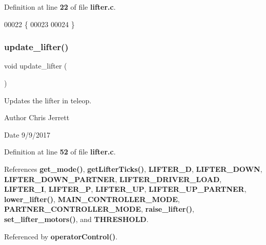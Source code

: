 Definition at line \textbf{ 22} of file \textbf{ lifter.\+c}.


\begin{DoxyCode}
00022                              \{
00023 
00024 \}
\end{DoxyCode}
\mbox{\label{lifter_8h_a59bb7413777ca16aba124aaedf95c79b}} 
\subsubsection{update\+\_\+lifter()}
{\footnotesize\ttfamily void update\+\_\+lifter (\begin{DoxyParamCaption}{ }\end{DoxyParamCaption})}



Updates the lifter in teleop. 

\begin{DoxyAuthor}{Author}
Chris Jerrett 
\end{DoxyAuthor}
\begin{DoxyDate}{Date}
9/9/2017 
\end{DoxyDate}


Definition at line \textbf{ 52} of file \textbf{ lifter.\+c}.



References \textbf{ get\+\_\+mode()}, \textbf{ get\+Lifter\+Ticks()}, \textbf{ L\+I\+F\+T\+E\+R\+\_\+D}, \textbf{ L\+I\+F\+T\+E\+R\+\_\+\+D\+O\+WN}, \textbf{ L\+I\+F\+T\+E\+R\+\_\+\+D\+O\+W\+N\+\_\+\+P\+A\+R\+T\+N\+ER}, \textbf{ L\+I\+F\+T\+E\+R\+\_\+\+D\+R\+I\+V\+E\+R\+\_\+\+L\+O\+AD}, \textbf{ L\+I\+F\+T\+E\+R\+\_\+I}, \textbf{ L\+I\+F\+T\+E\+R\+\_\+P}, \textbf{ L\+I\+F\+T\+E\+R\+\_\+\+UP}, \textbf{ L\+I\+F\+T\+E\+R\+\_\+\+U\+P\+\_\+\+P\+A\+R\+T\+N\+ER}, \textbf{ lower\+\_\+lifter()}, \textbf{ M\+A\+I\+N\+\_\+\+C\+O\+N\+T\+R\+O\+L\+L\+E\+R\+\_\+\+M\+O\+DE}, \textbf{ P\+A\+R\+T\+N\+E\+R\+\_\+\+C\+O\+N\+T\+R\+O\+L\+L\+E\+R\+\_\+\+M\+O\+DE}, \textbf{ raise\+\_\+lifter()}, \textbf{ set\+\_\+lifter\+\_\+motors()}, and \textbf{ T\+H\+R\+E\+S\+H\+O\+LD}.



Referenced by \textbf{ operator\+Control()}.


